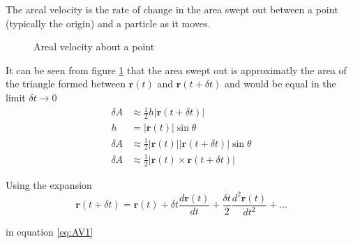 The areal velocity is the rate of change in the area swept out between a point (typically the origin) and a particle as it moves.
\begin{figure}[h]
  \centering
 
\caption{Areal velocity about a point} \label{fig:arealVelocity}
\end{figure}

It can be seen from figure \ref{fig:arealVelocity} that the area swept out is approximatly the area of the triangle formed between $\bm{r}(t)$ and $\bm{r}(t+\delta t)$ and would be equal in the limit $\delta t \rightarrow 0$
\begin{align}
\delta A&\approx\frac{1}{2}h|\bm{r}(t+\delta t)|  \nonumber \\
h &=|\bm{r}(t)|\sin \theta \nonumber\\
\delta A&\approx\frac{1}{2}|\bm{r}(t)||\bm{r}(t+\delta t)| \sin \theta  \nonumber \\
\delta A&\approx\frac{1}{2}|\bm{r}(t) \times \bm{r}(t+\delta t)| \label{eq:AV1}
\end{align}

Using the expansion
\begin{equation} \label{eq:expansion}
\bm{r}(t+\delta t)=\bm{r}(t)+\delta t \frac{d\bm{r}(t)}{dt}+\frac{\delta t}{2}\frac{d^2 \bm{r}(t)}{d t^2} +\dots
\end{equation}

in equation \ref{eq:AV1}